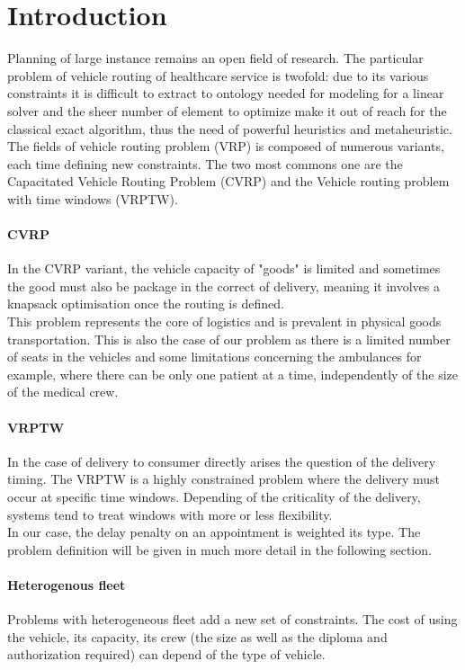 \documentclass[12pt]{memoir}
\begin{document}
\section{Introduction}
Planning of large instance remains an open field of research. The particular
problem of vehicle routing of healthcare service is twofold: due to its
various constraints it is difficult to extract to ontology needed for modeling for
a linear solver and the sheer number of element to optimize make it out of reach for
the classical exact algorithm, thus the need of powerful heuristics and 
metaheuristic. The fields of vehicle routing problem (VRP) is composed of numerous variants, each time defining new constraints. The two most commons one are the Capacitated Vehicle Routing Problem (CVRP) and the Vehicle routing problem with time windows (VRPTW).

\paragraph{CVRP} %
\label{par:CVRP}
In the CVRP variant, the vehicle capacity of "goods" is limited and sometimes the
good must also be package in the correct of delivery, meaning it involves a knapsack
optimisation once the routing is defined.\\
This problem represents the core of logistics and is prevalent in physical goods transportation. This is also the case
of our problem as there is a limited number of seats in the vehicles and some
limitations concerning the ambulances for example, where there can be only one
patient at a time, independently of the size of the medical crew.

\paragraph{VRPTW} %
\label{par:VRPTW}
In the case of delivery to consumer directly arises the question of the delivery
timing. The VRPTW is a highly constrained problem where the delivery must occur
at specific time windows. Depending of the criticality of the delivery, systems tend
to treat windows with more or less flexibility. \\ 
In our case, the delay penalty on an appointment is weighted its type. The problem definition will be given in much more
detail in the following section.

\paragraph{Heterogenous fleet} %
\label{par:Heterogenous fleet}
Problems with heterogeneous fleet add a new set of constraints. The cost of using
the vehicle, its capacity, its crew (the size as well as the diploma and
authorization required) can depend of the type of vehicle.
\end{document}
